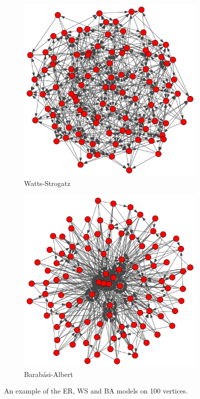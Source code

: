 \begin{figure}[ht]
\begin{subfigure}{.33 \linewidth}
    \includegraphics[scale=0.2]{random_graphs/strogatz100v5m05prob.pdf}
    \caption{Watts-Strogatz}
  \end{subfigure}%
  \begin{subfigure}{.33 \linewidth}

    \includegraphics[scale=0.2]{random_graphs/barabasi100em5.pdf}
    \caption{Barabási-Albert}
  \end{subfigure}
  \caption{\label{graphexamples} An example of the ER, WS and BA models on 100 vertices.}
\end{figure}

